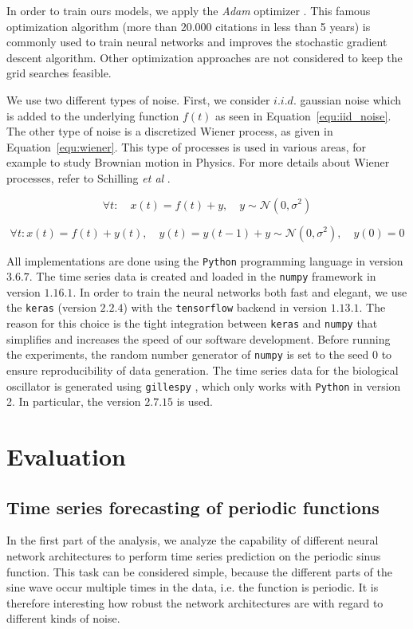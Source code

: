 \documentclass{article}
\begin{document}
In order to train ours models, we apply the \emph{Adam} optimizer
\cite{kingma2014}. This famous optimization algorithm (more than 20.000
citations in less than 5 years) is commonly used to train neural networks and
improves the stochastic gradient descent algorithm. Other optimization
approaches are not considered to keep the grid searches feasible.

We use two different types of noise. First, we consider $i.i.d.$ gaussian
noise which is added to the underlying function $f(t)$
as seen in Equation~\ref{equ:iid_noise}. The other type of noise is a
discretized Wiener process, as given in Equation~\ref{equ:wiener}.
This type of processes is used in various areas,
for example to study Brownian motion in Physics.
For more details about Wiener processes, refer to Schilling
\textit{et al} \cite{schilling2014}.

\begin{equation}
    \forall t: \quad x(t) = f(t) + y, \quad y \sim \mathcal{N}(0, \sigma^2)
    \label{equ:iid_noise}
\end{equation}

\begin{equation}
    \forall t: x(t) = f(t) + y(t), \quad y(t) = y(t-1) + y \sim \mathcal{N}(0, \sigma^2), \quad y(0) = 0
    \label{equ:wiener}
\end{equation}

All implementations are done using the \texttt{Python} programming language in
version $3.6.7$. The time series data is created and loaded in the
\texttt{numpy} framework in version $1.16.1$. In order to train the neural
networks both fast and elegant, we use the \texttt{keras} (version $2.2.4$)
with the
\texttt{tensorflow} backend in version $1.13.1$.
The reason for this choice is the tight
integration between \texttt{keras} and \texttt{numpy} that simplifies and
increases the speed of our software development. Before running the experiments,
the random number generator of \texttt{numpy} is set to the seed $0$ to ensure
reproducibility of data generation.
The time series data for the biological oscillator 
is generated using \texttt{gillespy} \cite{abel2016}, which only works with 
\texttt{Python} in version 2. In particular, the version $2.7.15$ is used.


\section{Evaluation}
\subsection{Time series forecasting of periodic functions}
\label{sec:sine}
In the first part of the analysis, we analyze the capability of different neural
network architectures to perform time series prediction on the periodic sinus
function. This task can be considered simple, because the different parts of the
sine wave occur multiple times in the data, i.e. the function is periodic.
It is therefore interesting how
robust the network architectures are with regard to different kinds of noise.
\end{document}
